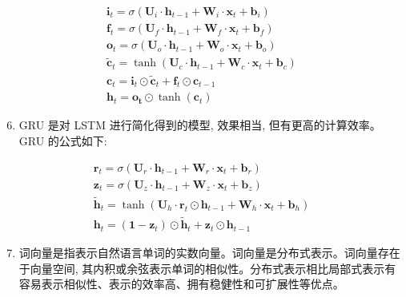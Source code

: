 \documentclass[10pt]{article}
\begin{document}
$$
\begin{gathered}
\boldsymbol{i}_{t}=\sigma\left(\boldsymbol{U}_{i} \cdot \boldsymbol{h}_{t-1}+\boldsymbol{W}_{i} \cdot \boldsymbol{x}_{t}+\boldsymbol{b}_{i}\right) \\
\boldsymbol{f}_{t}=\sigma\left(\boldsymbol{U}_{f} \cdot \boldsymbol{h}_{t-1}+\boldsymbol{W}_{f} \cdot \boldsymbol{x}_{t}+\boldsymbol{b}_{f}\right) \\
\boldsymbol{o}_{t}=\sigma\left(\boldsymbol{U}_{o} \cdot \boldsymbol{h}_{t-1}+\boldsymbol{W}_{o} \cdot \boldsymbol{x}_{t}+\boldsymbol{b}_{o}\right) \\
\tilde{\boldsymbol{c}}_{t}=\tanh \left(\boldsymbol{U}_{c} \cdot \boldsymbol{h}_{t-1}+\boldsymbol{W}_{c} \cdot \boldsymbol{x}_{t}+\boldsymbol{b}_{c}\right) \\
\boldsymbol{c}_{t}=\boldsymbol{i}_{t} \odot \tilde{\boldsymbol{c}}_{t}+\boldsymbol{f}_{t} \odot \boldsymbol{c}_{t-1} \\
\boldsymbol{h}_{t}=\boldsymbol{o}_{\boldsymbol{t}} \odot \tanh \left(\boldsymbol{c}_{t}\right)
\end{gathered}
$$

\begin{enumerate}
  \setcounter{enumi}{5}
  \item GRU 是对 LSTM 进行简化得到的模型, 效果相当, 但有更高的计算效率。GRU 的公式如下:
\end{enumerate}

$$
\begin{gathered}
\boldsymbol{r}_{t}=\sigma\left(\boldsymbol{U}_{r} \cdot \boldsymbol{h}_{t-1}+\boldsymbol{W}_{r} \cdot \boldsymbol{x}_{t}+\boldsymbol{b}_{r}\right) \\
\boldsymbol{z}_{t}=\sigma\left(\boldsymbol{U}_{z} \cdot \boldsymbol{h}_{t-1}+\boldsymbol{W}_{z} \cdot \boldsymbol{x}_{t}+\boldsymbol{b}_{z}\right) \\
\tilde{\boldsymbol{h}}_{t}=\tanh \left(\boldsymbol{U}_{h} \cdot \boldsymbol{r}_{t} \odot \boldsymbol{h}_{t-1}+\boldsymbol{W}_{h} \cdot \boldsymbol{x}_{t}+\boldsymbol{b}_{h}\right) \\
\boldsymbol{h}_{t}=\left(\boldsymbol{1}-\boldsymbol{z}_{t}\right) \odot \tilde{\boldsymbol{h}}_{t}+\boldsymbol{z}_{t} \odot \boldsymbol{h}_{t-1}
\end{gathered}
$$

\begin{enumerate}
  \setcounter{enumi}{6}
  \item 词向量是指表示自然语言单词的实数向量。词向量是分布式表示。词向量存在于向量空间, 其内积或余弦表示单词的相似性。分布式表示相比局部式表示有容易表示相似性、表示的效率高、拥有稳健性和可扩展性等优点。
\end{enumerate}
\end{document}

